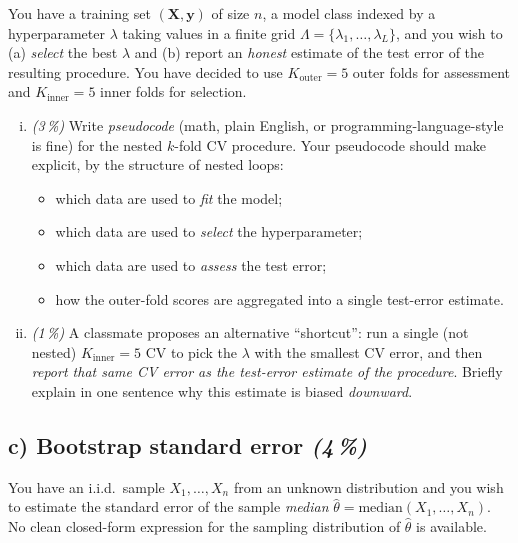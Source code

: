 \documentclass[11pt,a4paper]{article}
\newcommand{\subpoints}[1]{\textit{(#1\,\%)}}
\begin{document}
You have a training set $(\mathbf X, \mathbf y)$ of size $n$, a model class indexed by a hyperparameter $\lambda$ taking values in a finite grid $\Lambda = \{\lambda_1, \dots, \lambda_L\}$, and you wish to (a) \emph{select} the best $\lambda$ and (b) report an \emph{honest} estimate of the test error of the resulting procedure. You have decided to use $K_\text{outer} = 5$ outer folds for assessment and $K_\text{inner} = 5$ inner folds for selection.

\begin{enumerate}[(i)]
  \item \subpoints{3} Write \emph{pseudocode} (math, plain English, or programming-language-style is fine) for the nested $k$-fold CV procedure. Your pseudocode should make explicit, by the structure of nested loops:
  \begin{itemize}
    \item which data are used to \emph{fit} the model;
    \item which data are used to \emph{select} the hyperparameter;
    \item which data are used to \emph{assess} the test error;
    \item how the outer-fold scores are aggregated into a single test-error estimate.
  \end{itemize}
  \item \subpoints{1} A classmate proposes an alternative ``shortcut'': run a single (not nested) $K_\text{inner}=5$ CV to pick the $\lambda$ with the smallest CV error, and then \emph{report that same CV error as the test-error estimate of the procedure}. Briefly explain in one sentence why this estimate is biased \emph{downward}.
\end{enumerate}

\subsection*{c) Bootstrap standard error \subpoints{4}}

You have an i.i.d.\ sample $X_1, \dots, X_n$ from an unknown distribution and you wish to estimate the standard error of the sample \emph{median} $\hat\theta = \mathrm{median}(X_1, \dots, X_n)$. No clean closed-form expression for the sampling distribution of $\hat\theta$ is available.
\end{document}
